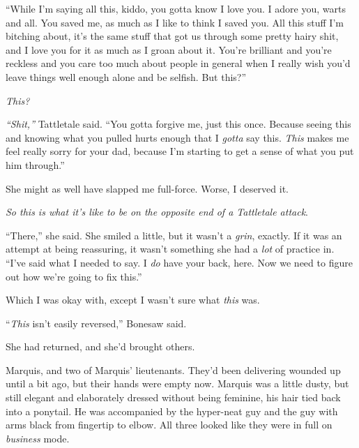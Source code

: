 ``While I'm saying all this, kiddo, you gotta know I love you.  I adore you, warts and all.  You saved me, as much as I like to think I saved you.  All this stuff I'm bitching about, it's the same stuff that got us through some pretty hairy shit, and I love you for it as much as I groan about it.  You're brilliant and you're reckless and you care too much about people in general when I really wish you'd leave things well enough alone and be selfish.  But this?''



\emph{This?}



\emph{``Shit,'' }Tattletale said.  ``You gotta forgive me, just this once.  Because seeing this and knowing what you pulled hurts enough that I \emph{gotta} say this.  \emph{This} makes me feel really sorry for your dad, because I'm starting to get a sense of what you put him through.''



She might as well have slapped me full-force.  Worse, I deserved it.



\emph{So this is what it's like to be on the opposite end of a Tattletale attack}.



``There,'' she said.  She smiled a little, but it wasn't a \emph{grin}, exactly.  If it was an attempt at being reassuring, it wasn't something she had a \emph{lot} of practice in.  ``I've said what I needed to say.  I \emph{do} have your back, here.  Now we need to figure out how we're going to fix this.''



Which I was okay with, except I wasn't sure what \emph{this} was.



``\emph{This} isn't easily reversed,'' Bonesaw said.



She had returned, and she'd brought others.



Marquis, and two of Marquis' lieutenants.  They'd been delivering wounded up until a bit ago, but their hands were empty now.  Marquis was a little dusty, but still elegant and elaborately dressed without being feminine, his hair tied back into a ponytail.  He was accompanied by the hyper-neat guy and the guy with arms black from fingertip to elbow.  All three looked like they were in full on \emph{business} mode.



